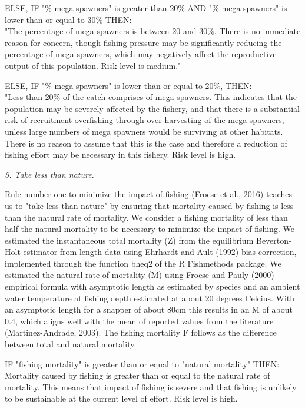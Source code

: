 \clearpage
\newpage

ELSE, IF "\% mega spawners" is greater than 20\% AND "\% mega spawners" is lower than or equal to 30\% THEN:\\[0cm]
"The percentage of mega spawners is between 20 and 30\%.  There is no immediate reason for concern, though fishing pressure may be significantly reducing the percentage of mega-spawners, which may negatively affect the reproductive output of this population. Risk level is medium."

ELSE, IF "\% mega spawners" is lower than or equal to 20\%, THEN:\\[0cm]
"Less than 20\% of the catch comprises of mega spawners.  This indicates that the population may be severely affected by the fishery, and that there is a substantial risk of recruitment overfishing through over harvesting of the mega spawners, unless large numbers of mega spawners would be surviving at other habitats. There is no reason to assume that this is the case and therefore a reduction of fishing effort may be necessary in this fishery. Risk level is high.

\textit{5. Take less than nature.}

Rule number one to minimize the impact of fishing (Froese et al., 2016) teaches us to "take less than nature" by ensuring that mortality caused by fishing is less than the natural rate of mortality. We consider a fishing mortality of less than half the natural mortality to be necessary to minimize the impact of fishing. We estimated the instantaneous total mortality (Z) from the equilibrium Beverton-Holt estimator from length data using Ehrhardt and Ault (1992) bias-correction, implemented through the function bheq2 of the R Fishmethods package. We estimated the natural rate of mortality (M) using Froese and Pauly (2000) empirical formula with asymptotic length as estimated by species and an ambient water temperature at fishing depth estimated at about 20 degrees Celcius. With an asymptotic length for a snapper of about 80cm this results in an M of about 0.4, which aligns well with the mean of reported values from the literature (Martinez-Andrade, 2003). The fishing mortality F follows as the difference between total and natural mortality.

IF "fishing mortality" is greater than or equal to "natural mortality" THEN:\\[0cm]
Mortality caused by fishing is greater than or equal to the natural rate of mortality. This means that impact of fishing is severe and that fishing is unlikely to be sustainable at the current level of effort. Risk level is high.

